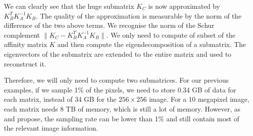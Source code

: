  We can clearly see that the huge submatrix \(K_C\) is now approximated by \(K_B^T K_A^{-1} K_B\).
 The quality of the approximation is measurable by the norm of the difference of the two above terms.
 We recognise the norm of the Schur complement \(\| K_C - K_B^T K_A^{-1} K_B \| \).
\else
 We only need to compute of subset of the affinity matrix \(K\) and then compute the eigendecomposition of a submatrix.
 The eigenvectors of the submatrix are extended to the entire matrix and used to reconstruct it.
\fi

Therefore, we will only need to compute two submatrices.
For our previous examples, if we sample 1\% of the pixels, we need to store 0.34 GB of data for each matrix, instead of 34 GB for the \(256 \times 256\) image.
For a 10 megapixel image, each matrix needs 8 TB of memory, which is still a lot of memory.
However, as \cite{fowlkes_spectral_2004} and \cite{glide_2014} propose, the sampling rate can be lower than 1\% and still contain most of the relevant image information.

